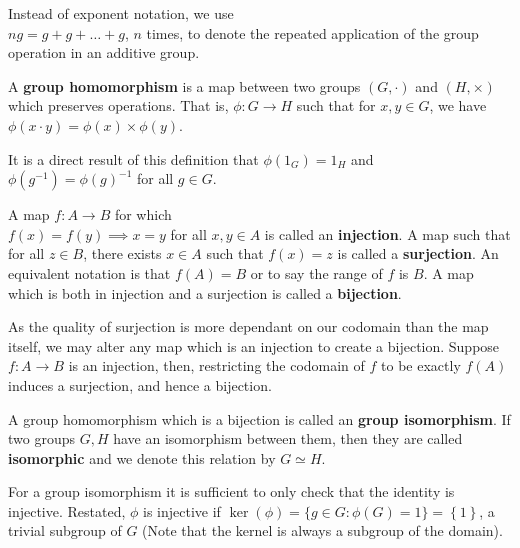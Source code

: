 \begin{notation}
	Instead of exponent notation, we use \\$ng = g + g + \ldots + g$, $n$ times, to denote the repeated application of the group operation in an additive group.
\end{notation}
\begin{definition}[Homomorphisms]
	A \textbf{group homomorphism} is a map between two groups $\left( G, \cdot \right)$ and $\left( H, \times \right) $ which preserves operations. That is, $\phi: G \to H$ such that for $x, y \in G$, we have $\phi \left( x\cdot y \right) = \phi \left( x \right) \times \phi \left( y \right) $.
\end{definition}
\begin{remark}
	It is a direct result of this definition that $\phi \left( 1_{G} \right) = 1_{H}$ and \\$\phi\left( g^{-1} \right)= \phi \left( g \right) ^{ -1}$ for all $g \in G$.
\end{remark}
\begin{definition}
	A map $f: A \to B$ for which \\$f\left( x \right) = f\left( y \right) \implies x=y$ for all $x , y \in A$ is called an \textbf{injection}. A map such that for all $z \in B$, there exists $x \in A$ such that $f\left( x \right) = z$ is called a \textbf{surjection}. An equivalent notation is that $f\left( A \right) = B$ or to say the range of $f$ is $B$. A map which is both in injection and a surjection is called a \textbf{bijection}.
\end{definition}
\begin{remark}
	As the quality of surjection is more dependant on our codomain than the map itself, we may alter any map which is an injection to create a bijection. Suppose $f: A \to B$ is an injection, then, restricting the codomain of $f$ to be exactly $f\left( A \right) $ induces a surjection, and hence a bijection.
\end{remark}
\begin{definition}[Isomorphism]
	A group homomorphism which is a bijection is called an \textbf{group isomorphism}. If two groups $G, H$ have an isomorphism between them, then they are called \textbf{isomorphic} and we denote this relation by $G \simeq H$.
\end{definition}
\begin{remark}
	For a group isomorphism it is sufficient to only check that the identity is injective. Restated, $\phi$ is injective if $\ker \left( \phi \right) = \{g \in G : \phi \left( G \right)  = 1	\} = \left\{ 1 \right\} $, a trivial subgroup of $G$ (Note that the kernel is always a subgroup of the domain).
\end{remark}
